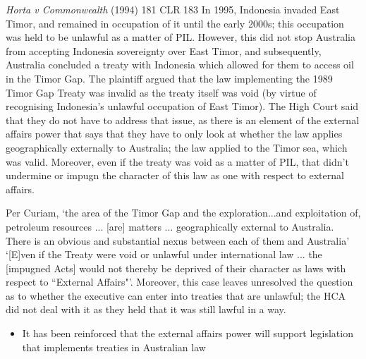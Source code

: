 \begin{casedetails}{\textit{Horta v Commonwealth} (1994) 181 CLR 183}\label{case:Horta v Commonwealth}
    \flushleft
    In 1995, Indonesia invaded East Timor, and remained in occupation of it until the early 2000s; this occupation was held to be unlawful as a matter of PIL. However, this did not stop Australia from accepting Indonesia sovereignty over East Timor, and subsequently, Australia concluded a treaty with Indonesia which allowed for them to access oil in the Timor Gap. The plaintiff argued that the law implementing the 1989 Timor Gap Treaty was invalid as the treaty itself was void (by virtue of recognising Indonesia's unlawful occupation of East Timor). The High Court said that they do not have to address that issue, as there is an element of the external affairs power that says that they have to only look at whether the law applies geographically externally to Australia; the law applied to the Timor sea, which was valid. Moreover, even if the treaty was void as a matter of PIL, that didn't undermine or impugn the character of this law as one with respect to external affairs.

    \vspace{\baselineskip}

    Per Curiam, `the area of the Timor Gap and the exploration...and exploitation of, petroleum resources ... [are] matters ... geographically external to Australia. There is an obvious and substantial nexus between each of them and Australia' `[E]ven if the Treaty were void or unlawful under international law ... the [impugned Acts] would not thereby be deprived of their character as laws with respect to ``External Affairs"'. Moreover, this case leaves unresolved the question as to whether the executive can enter into treaties that are unlawful; the HCA did not deal with it as they held that it was still lawful in a way.
\end{casedetails}

\begin{itemize}
    \item It has been reinforced that the external affairs power will support legislation that implements treaties in Australian law
\end{itemize}


